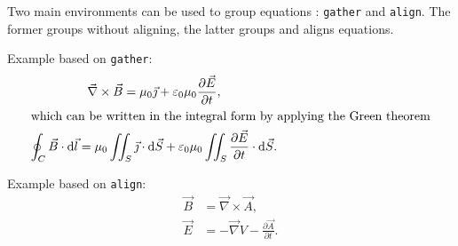 \documentclass[11pt, a4paper]{report}
\begin{document}
		Two main environments can be used to group equations : \texttt{gather} and \texttt{align}.
		The former groups without aligning, the latter groups and aligns equations.
		
		Example based on \texttt{gather}:
		\begin{gather}
			\vec{\nabla} \times \vec{B}
				= \mu_0 \vec{\jmath}
				+ \varepsilon_0 \mu_0 \frac{\partial \vec{E}}{\partial t}, \\
			\intertext{which can be written in the integral form by applying the Green theorem}
			\oint_{C} \vec{B} \cdot \mathrm{d} \vec{l}
				= \mu_0 \iint_S \vec{\jmath} \cdot \mathrm{d} \vec{S}
				+ \varepsilon_0 \mu_0 \iint_S \frac{\partial \vec{E}}{\partial t} \cdot \mathrm{d} \vec{S}.
		\end{gather}
		
		Example based on \texttt{align}:
		\begin{align}
			\vec{B} &= \vec{\nabla} \times \vec{A}, \\
			\vec{E} &= -\vec{\nabla} V - \frac{\partial \vec{A}}{\partial t}.
		\end{align}
%
\end{document}
